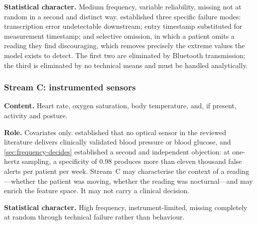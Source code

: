 \documentclass[12pt,a4paper,oneside]{report}
\begin{document}
\textbf{Statistical character.} Medium frequency, variable reliability, missing not at random in a second and distinct way.  established three specific failure modes: transcription error undetectable downstream; entry timestamp substituted for measurement timestamp; and selective omission, in which a patient omits a reading they find discouraging, which removes precisely the extreme values the model exists to detect. The first two are eliminated by Bluetooth transmission; the third is eliminated by no technical means and must be handled analytically.

\subsubsection{Stream C: instrumented sensors}

\textbf{Content.} Heart rate, oxygen saturation, body temperature, and, if present, activity and posture.

\textbf{Role.} Covariates only.  established that no optical sensor in the reviewed literature delivers clinically validated blood pressure or blood glucose, and \cref{sec:frequency-decides} established a second and independent objection: at one-hertz sampling, a specificity of 0.98 produces more than eleven thousand false alerts per patient per week. Stream~C may characterise the context of a reading---whether the patient was moving, whether the reading was nocturnal---and may enrich the feature space. It may not carry a clinical decision.

\textbf{Statistical character.} High frequency, instrument-limited, missing completely at random through technical failure rather than behaviour.
\end{document}
